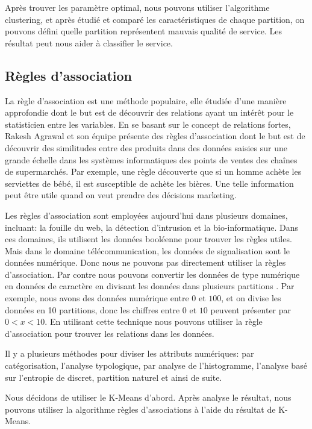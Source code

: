 Après trouver les paramètre optimal, nous pouvons utiliser l'algorithme clustering, et après étudié et comparé les caractéristiques de chaque partition, on pouvons défini quelle partition représentent mauvais qualité de service. Les résultat peut nous aider à classifier le service. 

\subsection{Règles d'association}
La règle d'association est une méthode populaire, elle étudiée d'une manière approfondie dont le but est de découvrir des relations ayant un intérêt pour le statisticien entre les variables. En se basant sur le concept de relations fortes, Rakesh Agrawal et son équipe présente des règles d'association dont le but est de découvrir des similitudes entre des produits dans des données saisies sur une grande échelle dans les systèmes informatiques des points de ventes des chaînes de supermarchés. Par exemple, une règle découverte que si un homme achète les serviettes de bébé, il est susceptible de achète les bières. Une telle information peut être utile quand on veut prendre des décisions marketing.

Les règles d'association sont employées aujourd'hui dans plusieurs domaines, incluant: la fouille du web, la détection d'intrusion et la bio-informatique.  Dans ces domaines, ils utilisent les données booléenne pour trouver les règles utiles. Mais dans le domaine télécommunication, les données de signalisation sont le données numérique. Donc nous ne pouvons pas directement utiliser la règles d'association. Par contre nous pouvons convertir les données de type numérique en données de caractère en divisant les données dans plusieurs partitions \cite{AR}. Par exemple, nous avons des données numérique entre $0$ et $100$, et on divise les données en 10 partitions, donc les chiffres entre $0$ et $10$ peuvent présenter par $0<x<10$. En utilisant cette technique nous pouvons utiliser la règle d'association pour trouver les relations dans les données.

 Il y a plusieurs méthodes pour diviser les attributs numériques: par catégorisation, l'analyse typologique, par analyse de l'histogramme, l'analyse basé sur l'entropie de discret, partition naturel et ainsi de suite. 
 
 Nous décidons de utiliser le K-Means d'abord. Après analyse le résultat, nous pouvons utiliser la algorithme règles d'associations à l'aide du résultat de K-Means.

